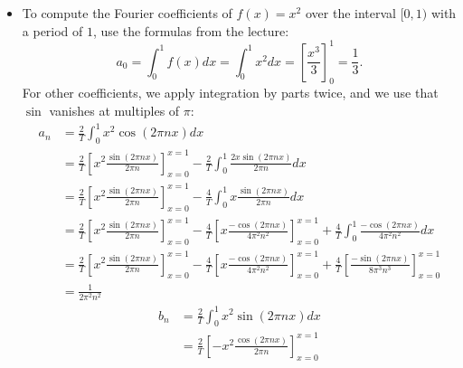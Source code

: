 \documentclass[11pt]{article}
\begin{document}
\begin{solution}     
    \begin{itemize}
        \item 
        To compute the Fourier coefficients of $f(x) = x^2$ over the interval $[0,1)$ with a period of $1$, use the formulas from the lecture:
        \[
            a_0 = \int_{0}^{1} f(x) dx  = \int_{0}^{1} x^2 dx  = \left[ \frac{x^3}{3} \right]_{0}^{1} = \frac 1 3.
        \]
        For other coefficients, we apply integration by parts twice, and we use that $\sin$ vanishes at multiples of $\pi$:
        \begin{align*}
            a_n 
            &
            = 
            \frac{2}{T}
            \int_{0}^{1} x^2 \cos(2\pi n x) dx
            \\&
            =
            \frac{2}{T}
            \left[ x^2 \frac{ \sin(2\pi n x) }{ 2\pi n } \right]_{x=0}^{x=1}
            -
            \frac{2}{T}
            \int_{0}^{1} \frac{ 2x \sin(2\pi n x) }{ 2\pi n } dx
            \\&
            =
            \frac{2}{T}
            \left[ x^2 \frac{ \sin(2\pi n x) }{ 2\pi n } \right]_{x=0}^{x=1}
            -
            \frac{4}{T}
            \int_{0}^{1} x \frac{ \sin(2\pi n x) }{ 2\pi n } dx
            \\&
            =
            \frac{2}{T}
            \left[ x^2 \frac{ \sin(2\pi n x) }{ 2\pi n } \right]_{x=0}^{x=1}
            -
            \frac{4}{T}
            \left[ x \frac{ -\cos(2\pi n x) }{ 4\pi^2 n^2 } \right]_{x=0}^{x=1}
            +
            \frac{4}{T}
            \int_{0}^{1} \frac{ -\cos(2\pi n x) }{ 4\pi^2 n^2 } dx
            \\&
            =
            \frac{2}{T}
            \left[ x^2 \frac{ \sin(2\pi n x) }{ 2\pi n } \right]_{x=0}^{x=1}
            -
            \frac{4}{T}
            \left[ x \frac{ -\cos(2\pi n x) }{ 4\pi^2 n^2 } \right]_{x=0}^{x=1}
            +
            \frac{4}{T}
            \left[ \frac{ -\sin(2\pi n x) }{ 8\pi^3 n^3 } \right]_{x=0}^{x=1}
            \\&
            = 
            \frac{1}{2\pi^2 n^2}
        \end{align*}
        \begin{align*}
            b_n 
            &
            = 
            \frac{2}{T}
            \int_{0}^{1} x^2 \sin(2\pi n x) dx
            \\&
            =
            \frac{2}{T}
            \left[- x^2 \frac{ \cos(2\pi n x) }{ 2\pi n } \right]_{x=0}^{x=1}

\end{align*}
\end{itemize}
\end{solution}
\end{document}
